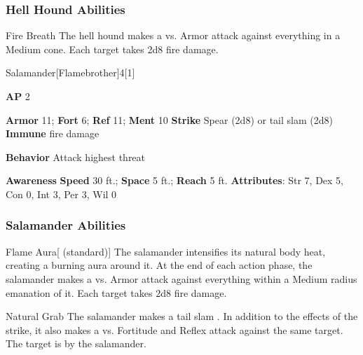 \subsubsection{Hell Hound Abilities}

\begin{freeability}{Fire Breath}
The hell hound makes a  vs. Armor attack against everything in a Medium cone.
\hit Each target takes 2d8 fire damage.
\end{freeability}

\begin{monsection}{Salamander}[Flamebrother]{4}[1]
\vspace{-1em}\vspace{-1em}
\begin{spellcontent}
\begin{spelltargetinginfo}
{\textbf{AP} 2}

\pari \textbf{Armor} 11;
\textbf{Fort} 6;
\textbf{Ref} 11;
\textbf{Ment} 10
\pari \textbf{Strike} Spear  (2d8) or tail slam  (2d8)
\pari \textbf{Immune} fire damage


\pari \textbf{Behavior} Attack highest threat
\end{spelltargetinginfo}
\end{spellcontent}

\begin{monsterfooter}
\pari \textbf{Awareness} 
\pari \textbf{Speed} 30 ft.;
\textbf{Space} 5 ft.;
\textbf{Reach} 5 ft.
\pari \textbf{Attributes}:
Str 7,
Dex 5,
Con 0,
Int 3,
Per 3,
Wil 0
\end{monsterfooter}
\end{monsection}


\subsubsection{Salamander Abilities}

\begin{apability}{Flame Aura}[ (standard)]
The salamander intensifies its natural body heat, creating a burning aura around it.
At the end of each action phase, the salamander makes a  vs. Armor
attack against everything within a Medium radius emanation of it.
\hit Each target takes 2d8 fire damage.
\end{apability}

\vspace{0.5em}
\begin{freeability}{Natural Grab}
The salamander makes a tail slam .
In addition to the effects of the strike, it also makes a  vs. Fortitude and Reflex attack against the same target.
\hit The target is  by the salamander.
\end{freeability}

